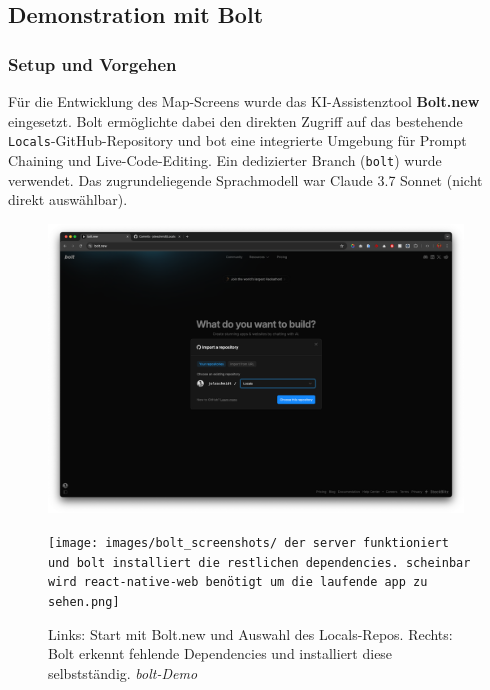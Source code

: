 \subsection{Demonstration mit Bolt}

\subsubsection{Setup und Vorgehen}
Für die Entwicklung des Map-Screens wurde das KI-Assistenztool
\textbf{Bolt.new} eingesetzt. Bolt ermöglichte dabei den direkten Zugriff auf
das bestehende \texttt{Locals}-GitHub-Repository und bot eine integrierte
Umgebung für Prompt Chaining und Live-Code-Editing. Ein dedizierter Branch
(\texttt{bolt}) wurde verwendet. Das zugrundeliegende Sprachmodell war Claude
3.7 Sonnet (nicht direkt auswählbar).

\begin{figure}[htbp]
      \centering
      \begin{minipage}{0.48\textwidth}
            \centering
            \includegraphics[width=0.98\textwidth]{images/bolt_screenshots/startseite-what-do-you-wanna-build-mit-github-branch.png}
      \end{minipage}
      \hfill
      \begin{minipage}{0.48\textwidth}
            \centering
            \texttt{[image: images/bolt\_screenshots/ der server funktioniert und bolt installiert die restlichen dependencies. scheinbar wird react-native-web benötigt um die laufende app zu sehen.png]}
      \end{minipage}
      \caption{Links: Start mit Bolt.new und Auswahl des Locals-Repos. Rechts: Bolt erkennt fehlende Dependencies und installiert diese selbstständig. \textit{bolt-Demo}}
      \label{fig:bolt-setup}
\end{figure}

